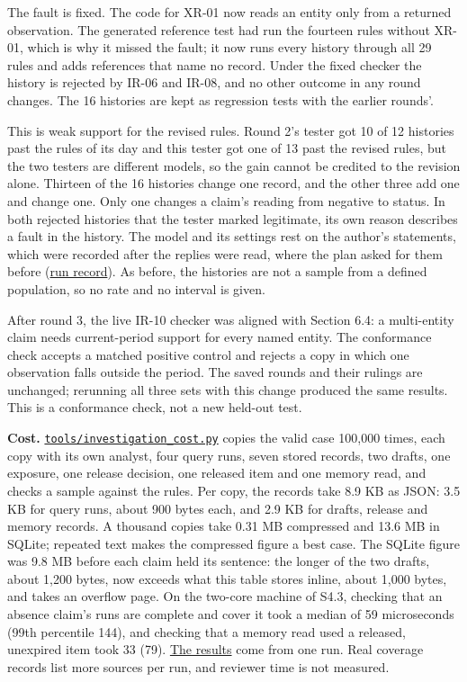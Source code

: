 \documentclass[
  11pt,
]{article}
\begin{document}
The fault is fixed. The code for \mbox{XR-01} now reads an entity only
from a returned observation. The generated reference test had run the
fourteen rules without \mbox{XR-01}, which is why it missed the fault;
it now runs every history through all 29 rules and adds references that
name no record. Under the fixed checker the history is rejected by
\mbox{IR-06} and \mbox{IR-08}, and no other outcome in any round
changes. The 16 histories are kept as regression tests with the earlier
rounds'.

This is weak support for the revised rules. Round 2's tester got 10 of
12 histories past the rules of its day and this tester got one of 13
past the revised rules, but the two testers are different models, so the
gain cannot be credited to the revision alone. Thirteen of the 16
histories change one record, and the other three add one and change one.
Only one changes a claim's reading from negative to status. In both
rejected histories that the tester marked legitimate, its own reason
describes a fault in the history. The model and its settings rest on the
author's statements, which were recorded after the replies were read,
where the plan asked for them before
(\href{tools/adversarial_cases/round3/RUN_RECORD.md}{run record}). As
before, the histories are not a sample from a defined population, so no
rate and no interval is given.

After round 3, the live \mbox{IR-10} checker was aligned with Section
6.4: a multi-entity claim needs current-period support for every named
entity. The conformance check accepts a matched positive control and
rejects a copy in which one observation falls outside the period. The
saved rounds and their rulings are unchanged; rerunning all three sets
with this change produced the same results. This is a conformance check,
not a new held-out test.

\textbf{Cost.}
\href{tools/investigation_cost.py}{\texttt{tools/investigation\_cost.py}}
copies the valid case 100,000 times, each copy with its own analyst,
four query runs, seven stored records, two drafts, one exposure, one
release decision, one released item and one memory read, and checks a
sample against the rules. Per copy, the records take 8.9 KB as JSON: 3.5
KB for query runs, about 900 bytes each, and 2.9 KB for drafts, release
and memory records. A thousand copies take 0.31 MB compressed and 13.6
MB in SQLite; repeated text makes the compressed figure a best case. The
SQLite figure was 9.8 MB before each claim held its sentence: the longer
of the two drafts, about 1,200 bytes, now exceeds what this table stores
inline, about 1,000 bytes, and takes an overflow page. On the two-core
machine of S4.3, checking that an absence claim's runs are complete and
cover it took a median of 59 microseconds (99th percentile 144), and
checking that a memory read used a released, unexpired item took 33
(79). \href{SUPPLEMENT/S4_INVESTIGATION_RECORDS/cost_results.json}{The
results} come from one run. Real coverage records list more sources per
run, and reviewer time is not measured.
\end{document}
